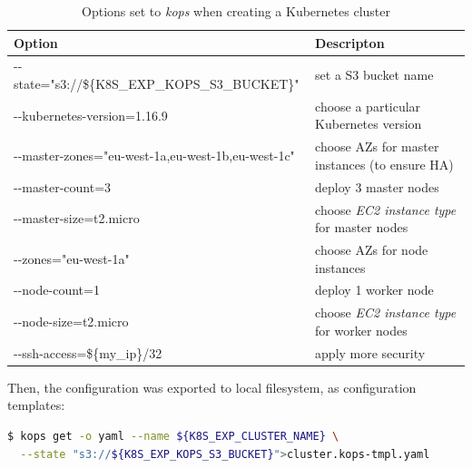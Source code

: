 \begin{table}[H]
\captionsetup{justification=centering}
\caption{\label{tab:kops-production-options}Options set to \textit{kops} when creating a Kubernetes cluster}
\small
\begin{tabularx}{1\textwidth} {
  | >{\centering\arraybackslash}X
  | >{\centering\arraybackslash}X | }
 \hline
  \textbf{Option} & \textbf{Descripton}  \\
 \hline
 -{}-state="s3://\$\{K8S\_EXP\_KOPS\_S3\_BUCKET\}"  & set a S3 bucket name \\
 \hline
 -{}-kubernetes-version=1.16.9  & choose a particular Kubernetes version \\
 \hline
 -{}-master-zones="eu-west-1a,eu-west-1b,eu-west-1c"  & choose AZs for master instances (to ensure HA) \\
 \hline
 -{}-master-count=3  & deploy 3 master nodes \\
 \hline
 -{}-master-size=t2.micro  & choose \textit{EC2 instance type} for master nodes \\
 \hline
 -{}-zones="eu-west-1a"  & choose AZs for node instances \\
 \hline
 -{}-node-count=1  & deploy 1 worker node \\
 \hline
 -{}-node-size=t2.micro  & choose \textit{EC2 instance type} for worker nodes \\
 \hline
 -{}-ssh-access=\$\{my\_ip\}/32  & apply more security \\
 \hline
\end{tabularx}
\end{table}


Then, the configuration was exported to local filesystem, as configuration templates:
\begin{lstlisting}[basicstyle=\small,xleftmargin=0cm,label=lst:5-eksctl-kops-prod-get-yaml,caption={Command used export \textit{kops} configuration from S3 to a local file},captionpos=b,language=Bash]
$ kops get -o yaml --name ${K8S_EXP_CLUSTER_NAME} \
  --state "s3://${K8S_EXP_KOPS_S3_BUCKET}">cluster.kops-tmpl.yaml
\end{lstlisting}

